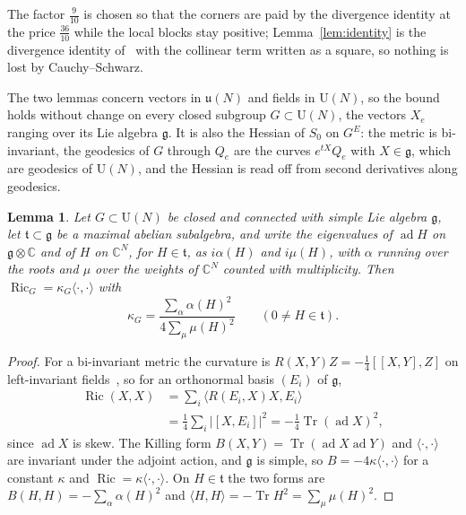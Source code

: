\documentclass[aps,prd,twocolumn,superscriptaddress,nofootinbib,longbibliography,floatfix,amsmath,amssymb,10pt]{revtex4-2}
\newtheorem{lemma}[theorem]{Lemma}
\theoremstyle{definition}
\theoremstyle{remark}
\newcommand{\C}{\mathbb{C}}
\newcommand{\U}{\mathrm{U}}
\newcommand{\g}{\mathfrak{g}}
\newcommand{\Tr}{\operatorname{Tr}}
\newcommand{\Ric}{\operatorname{Ric}}
\newcommand{\ip}[2]{\langle #1,#2\rangle}
\begin{document}
The factor $\frac9{10}$ is chosen so that the corners are paid by the
divergence identity at the price $\frac{36}{10}$ while the local blocks stay
positive; Lemma~\ref{lem:identity} is the divergence identity
of~\cite[Lemma~1]{BB26a} with the collinear term written as a square, so nothing is
lost by Cauchy--Schwarz.

The two lemmas concern vectors in $\mathfrak u(N)$ and fields in $\U(N)$, so the
bound holds without change on every closed subgroup $G\subset\U(N)$, the
vectors $X_e$ ranging over its Lie algebra $\g$. It is also the Hessian of
$S_0$ on $G^E$: the metric is bi-invariant, the geodesics of $G$ through
$Q_e$ are the curves $e^{tX}Q_e$ with $X\in\g$, which are geodesics of
$\U(N)$, and the Hessian is read off from second derivatives along
geodesics.

\begin{lemma}\label{lem:ricci}
Let $G\subset\U(N)$ be closed and connected with simple Lie algebra $\g$, let
$\mathfrak t\subset\g$ be a maximal abelian subalgebra, and write the
eigenvalues of $\operatorname{ad}H$ on $\g\otimes\C$ and of $H$ on $\C^N$, for
$H\in\mathfrak t$, as $i\alpha(H)$ and $i\mu(H)$, with $\alpha$ running over the
roots and $\mu$ over the weights of $\C^N$ counted with multiplicity. Then
$\Ric_G=\kappa_G\ip\cdot\cdot$ with
\[
\kappa_G=\frac{\sum_\alpha\alpha(H)^2}{4\sum_\mu\mu(H)^2}\qquad(0\ne H\in\mathfrak t).
\]
\end{lemma}

\begin{proof}
For a bi-invariant metric the curvature is $R(X,Y)Z=-\frac14[[X,Y],Z]$ on
left-invariant fields~\cite[Sect.~7]{Mil76}, so for an orthonormal basis
$(E_i)$ of $\g$,
\[
\begin{split}
\Ric(X,X)&=\sum_i\ip{R(E_i,X)X}{E_i}\\
&=\tfrac14\sum_i|[X,E_i]|^2=-\tfrac14\Tr(\operatorname{ad}X)^2 ,
\end{split}
\]
since $\operatorname{ad}X$ is skew. The Killing form $B(X,Y)=\Tr(\operatorname{ad}X
\operatorname{ad}Y)$ and $\ip\cdot\cdot$ are invariant under the adjoint
action, and $\g$ is simple, so $B=-4\kappa\ip\cdot\cdot$ for a constant
$\kappa$ and $\Ric=\kappa\ip\cdot\cdot$. On $H\in\mathfrak t$ the two forms
are $B(H,H)=-\sum_\alpha\alpha(H)^2$ and $\ip HH=-\Tr H^2=\sum_\mu\mu(H)^2$.
\end{proof}
\end{document}
